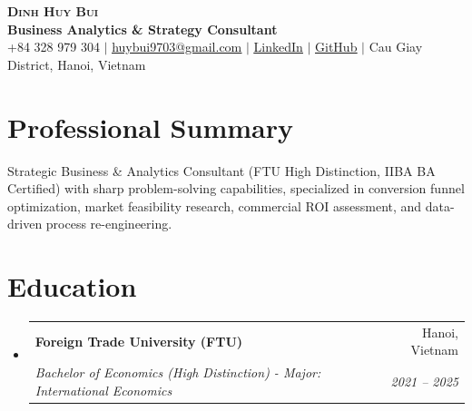 \documentclass[letterpaper,11pt]{article}
\makeatletter
\newcommand{\resumeSubheading}[4]{
  \vspace{2pt}\item
    \begin{tabular*}{\textwidth}[t]{l@{\extracolsep{\fill}}r}
      \textbf{#1} & #2 \\
      \textit{\small#3} & \textit{\small #4} \\
    \end{tabular*}\vspace{-2pt}
}
\newcommand{\resumeSubHeadingListStart}{\begin{itemize}[leftmargin=0.15in, label={}]}
\newcommand{\resumeSubHeadingListEnd}{\end{itemize}}
\makeatother
\begin{document}
\begin{center}
    \textbf{\Huge \scshape Dinh Huy Bui} \\ \vspace{3pt}
    \small \textbf{\color{NavyBlue} Business Analytics \& Strategy Consultant} \\ \vspace{4pt}
    \small +84 328 979 304 $|$ \href{mailto:huybui9703@gmail.com}{\underline{huybui9703@gmail.com}} $|$ 
    \href{https://www.linkedin.com/in/dinh-huy-bui/}{\underline{LinkedIn}} $|$
    \href{https://github.com/dewey97}{\underline{GitHub}} $|$
    Cau Giay District, Hanoi, Vietnam
\end{center}

\vspace{2pt}

\section*{Professional Summary}
\small{Strategic Business \& Analytics Consultant (FTU High Distinction, IIBA BA Certified) with sharp problem-solving capabilities, specialized in conversion funnel optimization, market feasibility research, commercial ROI assessment, and data-driven process re-engineering.}

\section*{Education}
  \resumeSubHeadingListStart
    \resumeSubheading
      {Foreign Trade University (FTU)}{Hanoi, Vietnam}
      {Bachelor of Economics (High Distinction) - Major: International Economics}{2021 -- 2025}
  \resumeSubHeadingListEnd

\end{document}
